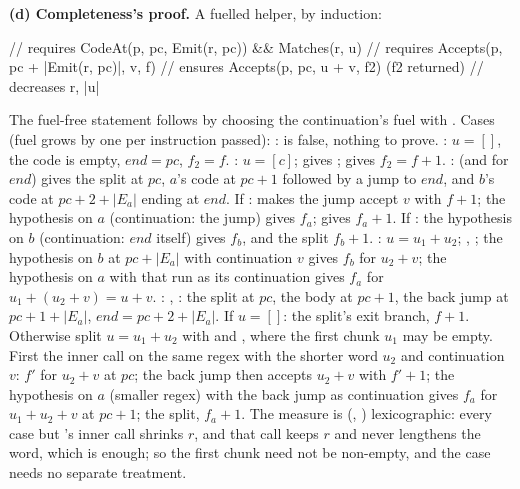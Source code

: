 \documentclass[11pt]{article}
\begin{document}
\begin{answer}
\textbf{(d) Completeness's proof.} A fuelled helper, by induction:
\begin{dafnycode}
// requires CodeAt(p, pc, Emit(r, pc)) && Matches(r, u)
// requires Accepts(p, pc + |Emit(r, pc)|, v, f)
// ensures  Accepts(p, pc, u + v, f2)          (f2 returned)
// decreases r, |u|
\end{dafnycode}
The fuel-free statement follows by choosing the continuation's fuel with
\dfy{:|}. Cases (fuel grows by one per instruction passed):
:  is false, nothing to prove. : $u = []$, the
code is empty, $\mathit{end} = pc$, $f_2 = f$. : $u = [c]$;
 gives ;  gives $f_2 = f
+ 1$. :  (and  for
$\mathit{end}$) gives the split at $pc$, $a$'s code at $pc+1$ followed by a
jump to $\mathit{end}$, and $b$'s code at $pc + 2 + |E_a|$ ending at
$\mathit{end}$. If :  makes the jump accept
$v$ with $f + 1$; the hypothesis on $a$ (continuation: the jump) gives $f_a$;
 gives $f_a + 1$. If : the hypothesis on
$b$ (continuation: $\mathit{end}$ itself) gives $f_b$, and the split $f_b + 1$.
: $u = u_1 + u_2$; , ; the
hypothesis on $b$ at $pc + |E_a|$ with continuation $v$ gives $f_b$ for $u_2 +
v$; the hypothesis on $a$ with that run as its continuation gives $f_a$ for
$u_1 + (u_2 + v) = u + v$. : , :
the split at $pc$, the body at $pc + 1$, the back jump  at $pc +
1 + |E_a|$, $\mathit{end} = pc + 2 + |E_a|$. If $u = []$: the split's exit
branch, $f + 1$. Otherwise split $u = u_1 + u_2$ with  and
, where the first chunk $u_1$ may be empty. First the
inner call on the same regex  with the shorter word $u_2$ and
continuation $v$: $f'$ for $u_2 + v$ at $pc$; the back jump then accepts $u_2 +
v$ with $f' + 1$; the hypothesis on $a$ (smaller regex) with the back jump as
continuation gives $f_a$ for $u_1 + u_2 + v$ at $pc + 1$; the split, $f_a + 1$.
The measure is (, ) lexicographic: every case but 's
inner call shrinks $r$, and that call keeps $r$ and never lengthens the word,
which is enough; so the first chunk need not be non-empty, and the case
 needs no separate treatment.


\end{answer}
\end{document}
